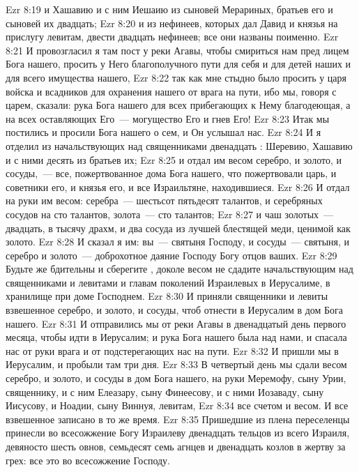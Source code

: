 \vs Ezr 8:19 и Хашавию и с ним Иешаию из сыновей Мерариных, братьев его и сыновей их двадцать;
\vs Ezr 8:20 и из нефинеев, которых дал Давид и князья  на прислугу левитам, двести двадцать нефинеев; все они названы поименно.
\rsbpar\vs Ezr 8:21 И провозгласил я там пост у реки Агавы, чтобы смириться нам пред лицем Бога нашего, просить у Него благополучного пути для себя и для детей наших и для всего имущества нашего,
\vs Ezr 8:22 так как мне стыдно было просить у царя войска и всадников для охранения нашего от врага на пути, ибо мы, говоря с царем, сказали: рука Бога нашего для всех прибегающих к Нему  благодеющая, а на всех оставляющих Его~--- могущество Его и гнев Его!
\vs Ezr 8:23 Итак мы постились и просили Бога нашего о сем, и Он услышал нас.
\vs Ezr 8:24 И я отделил из начальствующих над священниками двенадцать : Шеревию, Хашавию и с ними десять из братьев их;
\vs Ezr 8:25 и отдал им весом серебро, и золото, и сосуды,~--- все, пожертвованное  дома Бога нашего, что пожертвовали царь, и советники его, и князья его, и все Израильтяне,  находившиеся.
\vs Ezr 8:26 И отдал на руки им весом: серебра~--- шестьсот пятьдесят талантов, и серебряных сосудов на сто талантов, золота~--- сто талантов;
\vs Ezr 8:27 и чаш золотых~--- двадцать, в тысячу драхм, и два сосуда из лучшей блестящей меди, ценимой как золото.
\vs Ezr 8:28 И сказал я им: вы~--- святыня Господу, и сосуды~--- святыня, и серебро и золото~--- доброхотное даяние Господу Богу отцов ваших.
\vs Ezr 8:29 Будьте же бдительны и сберегите , доколе весом не сдадите начальствующим над священниками и левитами и главам поколений Израилевых в Иерусалиме, в хранилище при доме Господнем.
\vs Ezr 8:30 И приняли священники и левиты взвешенное серебро, и золото, и сосуды, чтоб отнести в Иерусалим в дом Бога нашего.
\rsbpar\vs Ezr 8:31 И отправились мы от реки Агавы в двенадцатый день первого месяца, чтобы идти в Иерусалим; и рука Бога нашего была над нами, и спасала нас от руки врага и от подстерегающих нас на пути.
\vs Ezr 8:32 И пришли мы в Иерусалим, и пробыли там три дня.
\vs Ezr 8:33 В четвертый день мы сдали весом серебро, и золото, и сосуды в дом Бога нашего, на руки Меремофу, сыну Урии, священнику, и с ним Елеазару, сыну Финеесову, и с ними Иозаваду, сыну Иисусову, и Ноадии, сыну Виннуя, левитам,
\vs Ezr 8:34 все счетом и весом. И все взвешенное записано в то же время.
\vs Ezr 8:35 Пришедшие из плена переселенцы принесли во всесожжение Богу Израилеву двенадцать тельцов из всего Израиля, девяносто шесть овнов, семьдесят семь агнцев и двенадцать козлов в жертву за грех: все это во всесожжение Господу.
